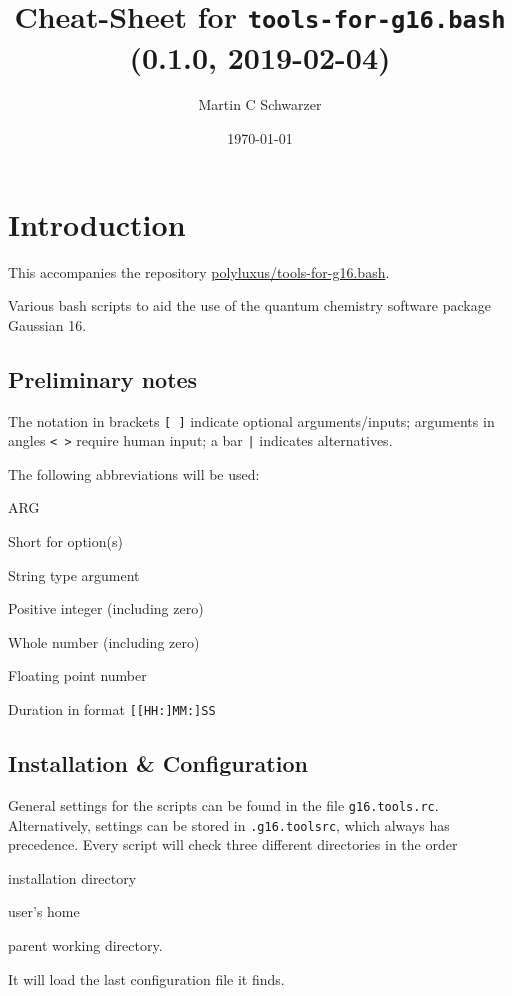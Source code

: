 \documentclass[   %
  final,          %
  a4paper,        %
  rscols=3,       %
  margin=1.0cm,   %
]{refsheet}
\title{Cheat-Sheet for \texttt{tools-for-g16.bash} (0.1.0, 2019-02-04)}
\author{Martin C Schwarzer}
\date{\today}
\begin{document}
\maketitle

\section{Introduction}

This accompanies the repository \href{https://github.com/polyluxus/tools-for-g16.bash}{polyluxus/tools-for-g16.bash}.

Various bash scripts to aid the use of the quantum chemistry software package Gaussian 16.

\subsection{Preliminary notes}

The notation in brackets \texttt{[ ]} indicate optional arguments/inputs;
arguments in angles \texttt{< >} require human input;
a bar \texttt{|} indicates alternatives.

The following abbreviations will be used:
\begin{rslisttt}{ARG}
  \item[opt] Short for option(s)
  \item[ARG] String type argument
  \item[INT] Positive integer (including zero)
  \item[NUM] Whole number (including zero)
  \item[FLT] Floating point number
  \item[DUR] Duration in format \texttt{[[HH:]MM:]SS} 
\end{rslisttt}

\subsection{Installation \& Configuration}

General settings for the scripts can be found in the file \texttt{g16.tools.rc}.
Alternatively, settings can be stored in \texttt{.g16.toolsrc}, 
which always has precedence.
Every script will check three different directories in the order
\begin{enumerate*}
\item installation directory
\item user's home
\item parent working directory.
\end{enumerate*}
It will load the last configuration file it finds.
\end{document}
